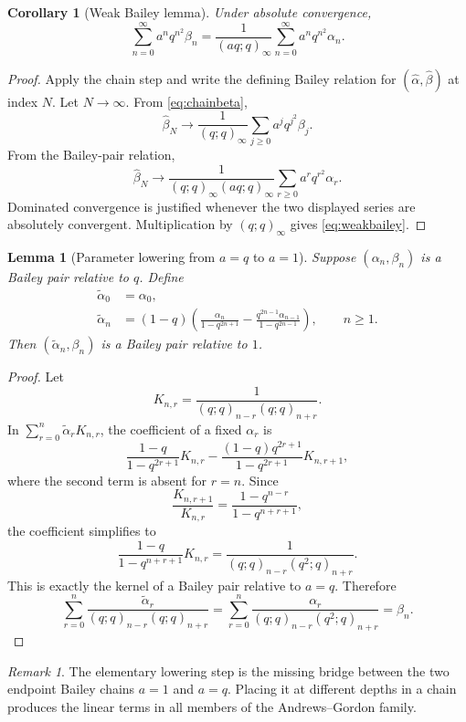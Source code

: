 \documentclass[11pt]{article}
\numberwithin{equation}{section}
\newtheorem{lemma}[theorem]{Lemma}
\newtheorem{corollary}[theorem]{Corollary}
\theoremstyle{definition}
\theoremstyle{remark}
\newtheorem{remark}[theorem]{Remark}
\newcommand{\BaileyTransformedAlpha}{\widehat{\alpha}}
\newcommand{\BaileyTransformedBeta}{\widehat{\beta}}
\begin{document}
\begin{corollary}[Weak Bailey lemma]\label{cor:weakbailey}
Under absolute convergence,
\begin{equation}\label{eq:weakbailey}
\sum_{n=0}^{\infty}a^nq^{n^2}\beta_n
=\frac1{(aq;q)_\infty}
\sum_{n=0}^{\infty}a^nq^{n^2}\alpha_n.
\end{equation}
\end{corollary}
\begin{proof}
Apply the chain step and write the defining Bailey relation for
$(\BaileyTransformedAlpha,\BaileyTransformedBeta)$ at index $N$.  Let $N\to\infty$.  From
\eqref{eq:chainbeta},
\[
\BaileyTransformedBeta_N\longrightarrow
\frac1{(q;q)_\infty}\sum_{j\ge0}a^jq^{j^2}\beta_j.
\]
From the Bailey-pair relation,
\[
\BaileyTransformedBeta_N\longrightarrow
\frac1{(q;q)_\infty(aq;q)_\infty}
\sum_{r\ge0}a^rq^{r^2}\alpha_r.
\]
Dominated convergence is justified whenever the two displayed series are
absolutely convergent.  Multiplication by $(q;q)_\infty$ gives
\eqref{eq:weakbailey}.
\end{proof}

\begin{lemma}[Parameter lowering from $a=q$ to $a=1$]\label{lem:lowering}
Suppose $(\alpha_n,\beta_n)$ is a Bailey pair relative to $q$.  Define
\begin{align}
\widetilde\alpha_0&=\alpha_0,\label{eq:lower0}\\
\widetilde\alpha_n&=(1-q)
\left(\frac{\alpha_n}{1-q^{2n+1}}
-\frac{q^{2n-1}\alpha_{n-1}}{1-q^{2n-1}}\right),
\qquad n\ge1.\label{eq:lowern}
\end{align}
Then $(\widetilde\alpha_n,\beta_n)$ is a Bailey pair relative to $1$.
\end{lemma}
\begin{proof}
Let
\[
K_{n,r}=\frac1{(q;q)_{n-r}(q;q)_{n+r}}.
\]
In
$\sum_{r=0}^n\widetilde\alpha_rK_{n,r}$, the coefficient of a fixed
$\alpha_r$ is
\[
\frac{1-q}{1-q^{2r+1}}K_{n,r}
-\frac{(1-q)q^{2r+1}}{1-q^{2r+1}}K_{n,r+1},
\]
where the second term is absent for $r=n$.  Since
\[
\frac{K_{n,r+1}}{K_{n,r}}
=\frac{1-q^{n-r}}{1-q^{n+r+1}},
\]
the coefficient simplifies to
\[
\frac{1-q}{1-q^{n+r+1}}K_{n,r}
=\frac1{(q;q)_{n-r}(q^2;q)_{n+r}}.
\]
This is exactly the kernel of a Bailey pair relative to $a=q$.  Therefore
\[
\sum_{r=0}^n\frac{\widetilde\alpha_r}
{(q;q)_{n-r}(q;q)_{n+r}}
=\sum_{r=0}^n\frac{\alpha_r}
{(q;q)_{n-r}(q^2;q)_{n+r}}
=\beta_n.
\]
\end{proof}

\begin{remark}
The elementary lowering step is the missing bridge between the two endpoint
Bailey chains $a=1$ and $a=q$.  Placing it at different depths in a chain
produces the linear terms in all members of the Andrews--Gordon family.
\end{remark}
\end{document}
